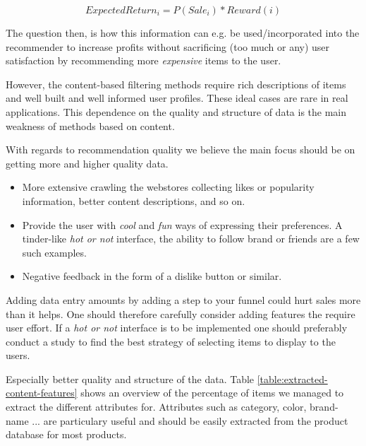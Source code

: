 \begin{equation}
ExpectedReturn_i = P(Sale_i) * Reward(i)
\end{equation}

The question then, is how this information can e.g. be used/incorporated into
the recommender to increase profits without sacrificing (too much or any) user
satisfaction by recommending more \emph{expensive} items to the user.


However, the content-based filtering methods require rich descriptions of items
and well built and well informed user profiles. These ideal cases are rare in
real applications. This dependence on the quality and structure of data is the
main weakness of methods based on content.

With regards to recommendation quality we believe the main focus should be on
getting more and higher quality data.

\begin{itemize}

\item More extensive crawling the webstores collecting likes or popularity
information, better content descriptions, and so on.

\item Provide the user with \emph{cool} and \emph{fun} ways of expressing their
preferences. A tinder-like \emph{hot or not} interface, the ability to follow
brand or friends are a few such examples.

\item Negative feedback in the form of a dislike button or similar.
\end{itemize}

Adding data entry amounts by adding a step to your funnel could hurt sales more
than it helps. One should therefore carefully consider adding features the
require user effort. If a \emph{hot or not} interface is to be implemented one
should preferably conduct a study to find the best strategy of selecting items
to display to the users.

Especially better quality and structure of the data. Table
\ref{table:extracted-content-features} shows an overview of the percentage of
items we managed to extract the different attributes for. Attributes such as
category, color, brand-name ...  are particulary useful and should be easily
extracted from the product database for most products.

